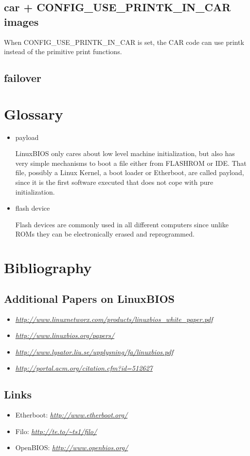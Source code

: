 \documentclass[titlepage,12pt]{article}
\begin{document}
\subsection{car + CONFIG\_USE\_PRINTK\_IN\_CAR images}
When CONFIG\_USE\_PRINTK\_IN\_CAR is set, the CAR code can use printk instead of the primitive print functions. 

\subsection{failover}

%
%

\section{Glossary}
\begin{itemize}
\item payload

LinuxBIOS only cares about low level machine initialization, but also has
very simple mechanisms to boot a file either from FLASHROM or IDE. That
file, possibly a Linux Kernel, a boot loader or Etherboot, are called
payload, since it is the first software executed that does not cope with
pure initialization.

\item flash device

Flash devices are commonly used in all different computers since unlike
ROMs they can be electronically erased and reprogrammed.
\end{itemize}

\newpage

%
%

\section{Bibliography}
\subsection{Additional Papers on LinuxBIOS}

\begin{itemize}
 \item { \small
 \textit{\url{http://www.linuxnetworx.com/products/linuxbios_white_paper.pdf}}
 }
 \item 
 \textit{\url{http://www.linuxbios.org/papers/}}
 \item 
 \textit{\url{http://www.lysator.liu.se/upplysning/fa/linuxbios.pdf}}
 \item 
 \textit{\url{http://portal.acm.org/citation.cfm?id=512627}}
\end{itemize}

\subsection {Links}

\begin{itemize}
 \item Etherboot: \textit{\url{http://www.etherboot.org/}}
 \item Filo: \textit{\url{http://te.to/~ts1/filo/}}
 \item OpenBIOS: \textit{\url{http://www.openbios.org/}}
\end{itemize}
\end{document}
